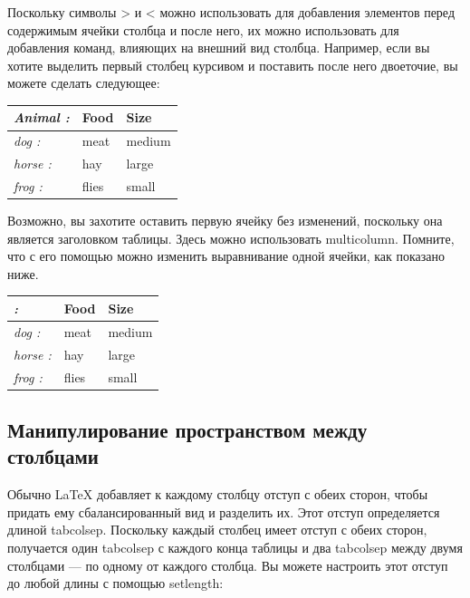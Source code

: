 \documentclass{article}
\begin{document}
  Поскольку символы > и < можно использовать для добавления элементов перед содержимым ячейки столбца и после него, их можно использовать для добавления команд, влияющих на внешний вид столбца.
  Например, если вы хотите выделить первый столбец курсивом и поставить после него двоеточие,
  вы можете сделать следующее:


  \smallskip

  \begin{tabular}{>{\itshape}l<{:} *{2}{l}}
  \toprule
    Animal & Food & Size \\
  \midrule
    dog & meat & medium \\
    horse & hay & large \\
    frog & flies & small \\
  \bottomrule
  \end{tabular}

  \smallskip


  Возможно, вы захотите оставить первую ячейку без изменений, поскольку она является заголовком таблицы. Здесь можно использовать
  multicolumn. Помните, что с его помощью можно изменить выравнивание одной
  ячейки, как показано ниже.

  \smallskip

  \begin{tabular}{>{\itshape}l<{:} *{2}{l}}
  \toprule
  \multicolumn{1}{l}{Animal} & Food & Size \\
  \midrule
    dog & meat & medium \\
    horse & hay & large \\
    frog & flies & small \\
  \bottomrule
  \end{tabular}

  \smallskip

  



  \subsection{Манипулирование пространством между столбцами}
  \label{subsec:width}
  

  Обычно LaTeX добавляет к каждому столбцу отступ с обеих сторон, чтобы придать ему сбалансированный вид и разделить их. Этот отступ определяется длиной tabcolsep. Поскольку каждый столбец имеет отступ с обеих сторон, получается один tabcolsep с
  каждого конца таблицы и два tabcolsep между двумя столбцами — по одному от каждого
  столбца. Вы можете настроить этот отступ до любой длины с помощью setlength:
\end{document}
